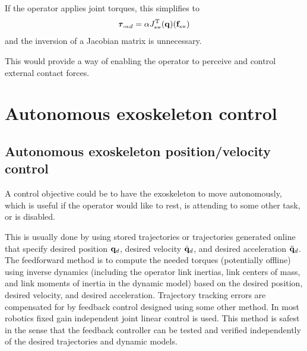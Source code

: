 \documentclass[letterpaper,12pt,fullpage]{article}
\newcommand{\ox}{{\mbox {\tiny ox}}}
\newcommand{\xw}{{\mbox {\tiny xw}}}
\begin{document}
If the operator applies joint torques, this simplifies to
\begin{equation}
{\vtau_{\ox}}_d = \alpha J_{\xw}^{\tr}(\vq) ( \vf_{\xw} )
\end{equation}
and the inversion of a Jacobian matrix is unnecessary.

This would provide a way of enabling the operator to perceive and control
external contact forces.

\section{Autonomous exoskeleton control}

\subsection{Autonomous exoskeleton position/velocity control}

A control objective could be to have the exoskeleton to move autonomously,
which is useful if the operator would like to rest, is attending to some other
task, or is disabled.

This is usually done by using stored trajectories or trajectories generated
online that specify desired position ${\bf q}_d$, 
desired velocity $\dot{{\bf q}}_d$, and
desired acceleration $\ddot{{\bf q}}_d$.
The feedforward method is to compute the needed torques (potentially offline)
using inverse
dynamics (including the operator link inertias, link centers of mass, and link
moments of inertia in the dynamic model) based on the desired position, 
desired velocity, and desired acceleration. Trajectory tracking errors are compensated
for by feedback control designed using some other method. In most robotics
fixed gain independent joint linear control is used.
This method is safest in the sense that the feedback controller can be tested
and verified independently of the desired trajectories and dynamic models.
\end{document}
